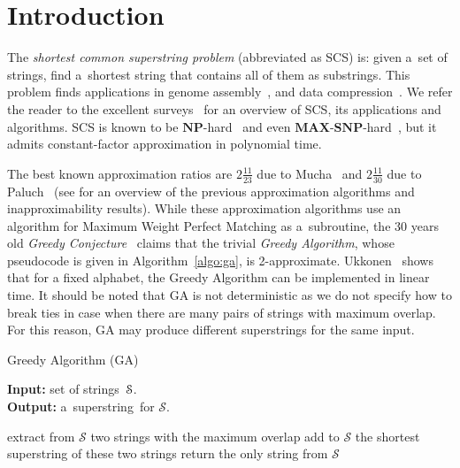 \section{Introduction}
\label{sec:intro}
The {\em shortest common superstring problem} (abbreviated as SCS) is:
given a~set of strings, find a~shortest string that contains all of them as
substrings. This problem finds applications in genome assembly~\cite{waterman1995introduction, pevzner2001eulerian}, and data compression~\cite{GMS1980, phdthesis, storer1987data}. We refer the reader to the excellent surveys~\cite{gevezes2014shortest, mucha2007tutorial} for an overview of SCS, its applications and algorithms.  SCS is known to be $\mathbf{NP}$-hard~\cite{GMS1980} and even $\mathbf{MAX}$-$\mathbf{SNP}$-hard~\cite{BJLTY1991}, but it admits constant-factor approximation in polynomial time.

The best known approximation ratios are $2\frac{11}{23}$ due to Mucha~\cite{M2013} 
and $2\frac{11}{30}$ due to Paluch~\cite{P14} 
(see \cite[Section~2.1]{GKM13} for an overview of the 
previous approximation algorithms
and inapproximability results). While these approximation algorithms use an algorithm for Maximum Weight Perfect Matching as a~subroutine, the $30$ years old \emph{Greedy Conjecture}~\cite{storer1987data, TU1988, T1989, BJLTY1991} claims that the trivial \emph{Greedy Algorithm}, whose pseudocode is given in Algorithm~\ref{algo:ga}, is 2-approximate. Ukkonen~\cite{ukkonen1990linear} shows that for a fixed alphabet, the Greedy Algorithm can be implemented in linear time. It should be noted that GA is not deterministic as we do not specify how to break ties in case when there are many pairs of strings with maximum overlap. For this reason, GA may produce different superstrings for the same input.


\begin{algorithm}[ht]
\label{algo:ga}
\caption{Greedy Algorithm (GA)}
\hspace*{\algorithmicindent} \textbf{Input:} set of strings~${\cal S}$.\\
\hspace*{\algorithmicindent} \textbf{Output:} a~superstring~for $\mathcal{S}$.
\begin{algorithmic}[1]
\State extract from $\mathcal{S}$ two strings with the maximum overlap
\State add to $\mathcal{S}$ the shortest superstring of these two strings
\EndWhile
\State return the only string from $\mathcal{S}$
\end{algorithmic}
\end{algorithm}


